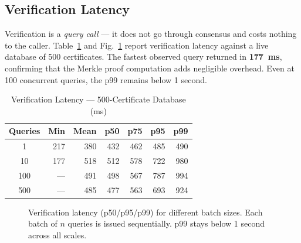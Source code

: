 \documentclass[conference]{IEEEtran}
\begin{document}
\subsection{Verification Latency}

Verification is a \emph{query call} — it does not go through consensus and costs nothing to the caller. Table~\ref{tab:verif} and Fig.~\ref{fig:verif_perc} report verification latency against a live database of 500 certificates. The fastest observed query returned in \textbf{177~ms}, confirming that the Merkle proof computation adds negligible overhead. Even at 100 concurrent queries, the p99 remains below 1 second.

\begin{table}[t]
\caption{Verification Latency --- 500-Certificate Database (ms)}
\label{tab:verif}
\centering\small\renewcommand{\arraystretch}{1.1}
\begin{tabular}{@{}crrrrrr@{}}
\toprule
\textbf{Queries} & \textbf{Min} & \textbf{Mean} & \textbf{p50} & \textbf{p75} & \textbf{p95} & \textbf{p99} \\
\midrule
1   & 217 & 380 & 432 & 462 & 485 & 490 \\
10  & 177 & 518 & 512 & 578 & 722 & 980 \\
100 & --- & 491 & 498 & 567 & 787 & 994 \\
500 & --- & 485 & 477 & 563 & 693 & 924 \\
\bottomrule
\end{tabular}
\end{table}

\begin{figure}[t]
\centering
{}
\caption{Verification latency (p50/p95/p99) for different batch sizes. Each batch of $n$ queries is issued sequentially. p99 stays below 1 second across all scales.}
\label{fig:verif_perc}
\end{figure}
\end{document}
